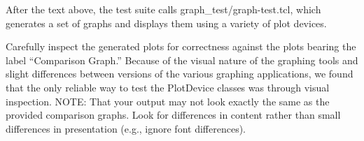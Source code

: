 \documentclass[11pt]{article}
\begin{document}
After the text above, the test suite calls graph\_test/graph-test.tcl,
which generates a set of graphs and displays them using a variety of
plot devices.  

Carefully inspect the generated plots for correctness against the
plots bearing the label ``Comparison Graph.'' Because of the visual
nature of the graphing tools and slight differences between versions
of the various graphing applications, we found that the only reliable
way to test the PlotDevice classes was through visual
inspection.  NOTE: That your output may not look exactly the same as
the provided comparison graphs.  Look for differences in content rather
than small differences in presentation (e.g., ignore font
differences).

%
%
%
%
%
%
%
%
%
%
%
\end{document}
